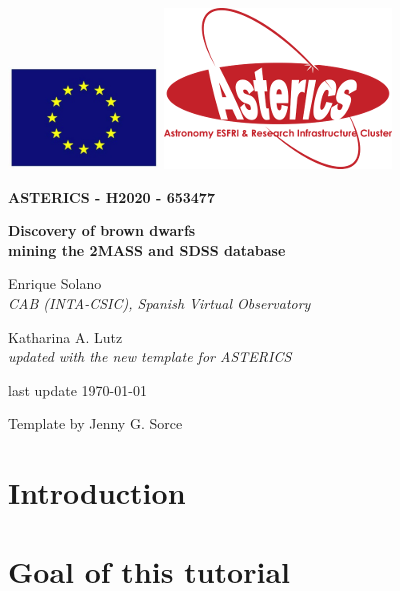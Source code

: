 \documentclass [a4paper, 12pt]{article}
\begin{document}
\begin{center}\includegraphics[width=0.3\textwidth]{../images/logo_euro.png} 
	\hspace{5cm}\includegraphics[width=0.4 
	\textwidth]{../images/logo_asterics.png}\\
\vspace{1.5cm}

\begin{Huge} 
	\textbf{ASTERICS - H2020 - 653477} 
\end{Huge} 
\end{center}
	
	
\vspace{1cm}
\Huge
\begin{center}
	\bf Discovery of brown dwarfs \\ mining the 2MASS and SDSS database
\end{center}
	
	
\vspace{1cm}
\large
\begin{center}
	Enrique Solano\\ 
	\textit{CAB (INTA-CSIC), Spanish Virtual Observatory}
\end{center}
\vspace{0.5cm}
\begin{center}
	Katharina A. Lutz\\
	\textit{updated with the new template for ASTERICS}
\end{center}
\vspace{0.5cm}
\begin{center}
	last update \today
\end{center}

\vspace{3.5cm}
Template by Jenny G. Sorce
	
	
	
\newpage
\normalsize
\vfill
\tableofcontents
\vfill
	
\newpage
	
\justify
\section{Introduction}
	
\section{Goal of this tutorial} 
	
	
\end{document}
